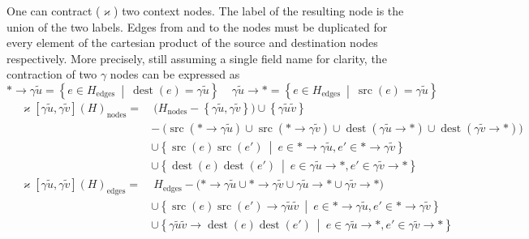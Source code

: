 \documentclass[11pt]{article}
\renewcommand{\kappa}{\varkappa}
\DeclareMathOperator{\dest}{dest}
\DeclareMathOperator{\src}{src}
\begin{document}
One can contract ($\kappa$) two context nodes.
The label of the resulting node is the union of the two labels.
Edges from and to the nodes must be duplicated for every element of the cartesian product of the source and destination nodes respectively.
More precisely, still assuming a single field name for clarity, the contraction of two $\gamma$ nodes can be expressed as
\[
*\to\gamma\tilde{u} = \left\{ e \in H_{\text{edges}} ~\middle|~ \dest(e) = \gamma\tilde{u} \right\}
\ \ \ \ \ 
\gamma\tilde{u}\to * = \left\{ e \in H_{\text{edges}} ~\middle|~ \src(e) = \gamma\tilde{u} \right\} 
\]
\begin{align*}
&\kappa[\gamma\tilde{u},\gamma\tilde{v}](H)_{\text{nodes}} = &\ \big( H_{\text{nodes}} - \left\{\gamma\tilde{u}, \gamma\tilde{v}\right\} \big) \cup \left\{ \gamma\tilde{u}\tilde{v} \right\} \\
&&-\ \big( \src(*\to\gamma\tilde{u}) \cup \src(*\to\gamma\tilde{v}) \cup \dest(\gamma\tilde{u}\to *) \cup \dest(\gamma\tilde{v}\to *) \big) \\
&&\cup \left\{ \src(e)\src(e') ~\middle|~ e \in *\to\gamma\tilde{u}, e' \in *\to\gamma\tilde{v} \right\} \\
&&\cup \left\{ \dest(e)\dest(e') ~\middle|~ e \in \gamma\tilde{u}\to *, e' \in \gamma\tilde{v}\to * \right\} \\
&\kappa[\gamma\tilde{u},\gamma\tilde{v}](H)_{\text{edges}} = &\ H_{\text{edges}} - \big( *\to\gamma\tilde{u} \cup *\to\gamma\tilde{v} \cup \gamma\tilde{u}\to * \cup \gamma\tilde{v}\to * \big) \\
&&\cup \left\{ \src(e)\src(e') \to \gamma\tilde{u}\tilde{v} ~\middle|~ e \in *\to\gamma\tilde{u}, e' \in *\to\gamma\tilde{v} \right\} \\
&&\cup \left\{ \gamma\tilde{u}\tilde{v} \to \dest(e)\dest(e') ~\middle|~ e \in \gamma\tilde{u}\to *, e' \in \gamma\tilde{v}\to * \right\} \\
\end{align*}
\end{document}
